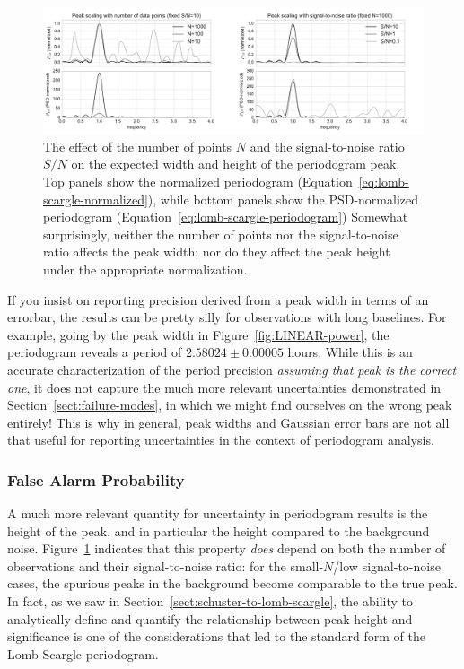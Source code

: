 \documentclass[preprint]{aastex}
\newcommand{\fig}[1]{Figure~\ref{fig:#1}}
\newcommand{\figlabel}[1]{\label{fig:#1}}
\newcommand{\Eq}[1]{Equation~\ref{eq:#1}}
\newcommand{\eq}[1]{\Eq{#1}}
\newcommand{\Sect}[1]{Section~\ref{sect:#1}}
\newcommand{\sect}[1]{\Sect{#1}}
\begin{document}
\begin{figure}[ht]
  \centering
  \includegraphics[width=\textwidth]{fig26_peak_width_height}
  \caption{The effect of the number of points $N$ and the signal-to-noise
    ratio $S/N$ on the expected width and height of the periodogram peak.
    Top panels show the normalized periodogram (\eq{lomb-scargle-normalized}),
    while bottom panels show the PSD-normalized periodogram
    (\eq{lomb-scargle-periodogram})
    Somewhat surprisingly, neither the number of points nor the signal-to-noise
    ratio affects the peak width; nor do they affect the peak height under
    the appropriate normalization.
    \figlabel{peak-width-height}}
\end{figure}

If you insist on reporting precision derived from a peak width
in terms of an errorbar, the results can be pretty silly for observations
with long baselines.
For example, going by the peak width in \fig{LINEAR-power}, the
periodogram reveals a period of $2.58024 \pm 0.00005$ hours.
While this is an accurate characterization of the period precision
{\it assuming that peak is the correct one}, it does not capture the
much more relevant uncertainties demonstrated in \sect{failure-modes},
in which we might find ourselves on the wrong peak entirely!
This is why in general, peak widths and Gaussian error bars are not all that
useful for reporting uncertainties in the context of periodogram analysis.

\subsubsection{False Alarm Probability}

A much more relevant quantity for uncertainty in periodogram results is the
height of the peak, and in particular the height compared to the background
noise.
\fig{peak-width-height} indicates that this property {\it does} depend on
both the number of observations and their signal-to-noise ratio: for the
small-$N$/low signal-to-noise cases, the spurious peaks in the background
become comparable to the true peak.
In fact, as we saw in \sect{schuster-to-lomb-scargle}, the ability to
analytically define and quantify the relationship between peak height
and significance is one of the considerations that led to the standard
form of the Lomb-Scargle periodogram.
\end{document}
